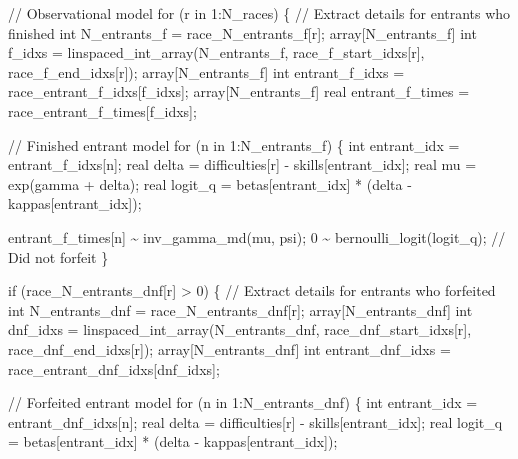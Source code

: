 \documentclass[
  letterpaper,
  DIV=11,
  numbers=noendperiod]{scrartcl}
\newenvironment{Shaded}{\begin{snugshade}}{\end{snugshade}}
\newcommand{\CommentTok}[1]{\textcolor[rgb]{0.37,0.37,0.37}{#1}}
\newcommand{\ControlFlowTok}[1]{\textcolor[rgb]{0.00,0.23,0.31}{#1}}
\newcommand{\DataTypeTok}[1]{\textcolor[rgb]{0.68,0.00,0.00}{#1}}
\newcommand{\DecValTok}[1]{\textcolor[rgb]{0.68,0.00,0.00}{#1}}
\newcommand{\NormalTok}[1]{\textcolor[rgb]{0.00,0.23,0.31}{#1}}
\begin{document}
\begin{codelisting}
\begin{Shaded}
\begin{Highlighting}[]
  \CommentTok{// Observational model}
  \ControlFlowTok{for}\NormalTok{ (r }\ControlFlowTok{in} \DecValTok{1}\NormalTok{:N\_races) \{}
    \CommentTok{// Extract details for entrants who finished}
    \DataTypeTok{int}\NormalTok{ N\_entrants\_f = race\_N\_entrants\_f[r];}
    \DataTypeTok{array}\NormalTok{[N\_entrants\_f] }\DataTypeTok{int}\NormalTok{ f\_idxs = linspaced\_int\_array(N\_entrants\_f,}
\NormalTok{                                                         race\_f\_start\_idxs[r],}
\NormalTok{                                                         race\_f\_end\_idxs[r]);}
    \DataTypeTok{array}\NormalTok{[N\_entrants\_f] }\DataTypeTok{int}\NormalTok{ entrant\_f\_idxs = race\_entrant\_f\_idxs[f\_idxs];}
    \DataTypeTok{array}\NormalTok{[N\_entrants\_f] }\DataTypeTok{real}\NormalTok{ entrant\_f\_times = race\_entrant\_f\_times[f\_idxs];}

    \CommentTok{// Finished entrant model}
    \ControlFlowTok{for}\NormalTok{ (n }\ControlFlowTok{in} \DecValTok{1}\NormalTok{:N\_entrants\_f) \{}
      \DataTypeTok{int}\NormalTok{ entrant\_idx = entrant\_f\_idxs[n];}
      \DataTypeTok{real}\NormalTok{ delta = difficulties[r] {-} skills[entrant\_idx];}
      \DataTypeTok{real}\NormalTok{ mu = exp(gamma + delta);}
      \DataTypeTok{real}\NormalTok{ logit\_q = betas[entrant\_idx] * (delta {-} kappas[entrant\_idx]);}

\NormalTok{      entrant\_f\_times[n] \textasciitilde{} inv\_gamma\_md(mu, psi);}
      \DecValTok{0}\NormalTok{ \textasciitilde{} bernoulli\_logit(logit\_q); }\CommentTok{// Did not forfeit}
\NormalTok{    \}}

    \ControlFlowTok{if}\NormalTok{ (race\_N\_entrants\_dnf[r] \textgreater{} }\DecValTok{0}\NormalTok{) \{}
      \CommentTok{// Extract details for entrants who forfeited}
      \DataTypeTok{int}\NormalTok{ N\_entrants\_dnf = race\_N\_entrants\_dnf[r];}
      \DataTypeTok{array}\NormalTok{[N\_entrants\_dnf]}
        \DataTypeTok{int}\NormalTok{ dnf\_idxs = linspaced\_int\_array(N\_entrants\_dnf,}
\NormalTok{                                           race\_dnf\_start\_idxs[r],}
\NormalTok{                                           race\_dnf\_end\_idxs[r]);}
      \DataTypeTok{array}\NormalTok{[N\_entrants\_dnf]}
        \DataTypeTok{int}\NormalTok{ entrant\_dnf\_idxs = race\_entrant\_dnf\_idxs[dnf\_idxs];}

      \CommentTok{// Forfeited entrant model}
      \ControlFlowTok{for}\NormalTok{ (n }\ControlFlowTok{in} \DecValTok{1}\NormalTok{:N\_entrants\_dnf) \{}
        \DataTypeTok{int}\NormalTok{ entrant\_idx = entrant\_dnf\_idxs[n];}
        \DataTypeTok{real}\NormalTok{ delta = difficulties[r] {-} skills[entrant\_idx];}
        \DataTypeTok{real}\NormalTok{ logit\_q = betas[entrant\_idx] * (delta {-} kappas[entrant\_idx]);}


\end{Highlighting}
\end{Shaded}
\end{codelisting}
\end{document}
